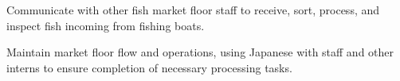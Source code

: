 \documentclass[letterpaper]{deedy-resume_sm} %
\begin{document}
\sectionspace %
\vspace{\topsep} %
\begin{tightitemize}
\item Communicate with other fish market floor staff to receive, sort, process, and inspect fish incoming from fishing boats. 
\item Maintain market floor flow and operations, using Japanese with staff and other interns to ensure completion of necessary processing tasks.
\end{tightitemize}
\sectionspace %

\end{document}
